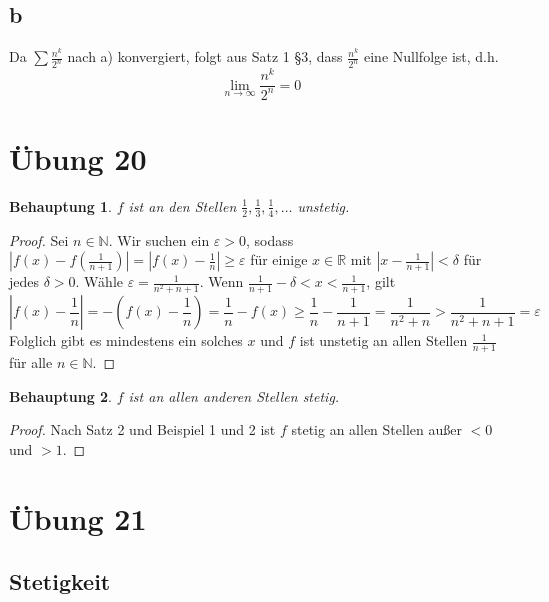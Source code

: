 \documentclass[a4paper,10pt]{article}
\newtheorem{claim}{Behauptung}
\begin{document}
\subsection*{b}

Da $\sum \frac{n^k}{2^n}$ nach a) konvergiert, folgt aus Satz 1 §3, dass $\frac{n^k}{2^n}$ eine Nullfolge ist, d.h.
\begin{equation}
 \lim_{n \rightarrow \infty} \frac{n^k}{2^n} = 0
\end{equation}

\section*{Übung 20}

\begin{claim}
 $f$ ist an den Stellen $\frac{1}{2}, \frac{1}{3}, \frac{1}{4}, \dots$ unstetig.
\end{claim}

\begin{proof}
 Sei $n \in \mathbb{N}$.
 Wir suchen ein $\varepsilon > 0$, sodass $|f(x) - f(\frac{1}{n + 1})| = |f(x) - \frac{1}{n}| \ge \varepsilon$ für einige $x \in \mathbb{R}$ mit $|x - \frac{1}{n + 1}| < \delta$ für jedes $\delta > 0$.
 Wähle $\varepsilon = \frac{1}{n^2 + n + 1}$.
 Wenn $\frac{1}{n + 1} - \delta < x < \frac{1}{n + 1}$, gilt
 \begin{equation}
  |f(x) - \frac{1}{n}| = -(f(x) - \frac{1}{n}) = \frac{1}{n} - f(x) \ge \frac{1}{n} - \frac{1}{n + 1} = \frac{1}{n^2 + n} > \frac{1}{n^2 + n + 1} = \varepsilon
 \end{equation}
 Folglich gibt es mindestens ein solches $x$ und $f$ ist unstetig an allen Stellen $\frac{1}{n + 1}$ für alle $n \in \mathbb{N}$.
\end{proof}

\begin{claim}
 $f$ ist an allen anderen Stellen stetig.
\end{claim}

\begin{proof}
 Nach Satz 2 und Beispiel 1 und 2 ist $f$ stetig an allen Stellen außer $< 0$ und $> 1$.
\end{proof}

\section*{Übung 21}

\subsection*{Stetigkeit}
\end{document}
